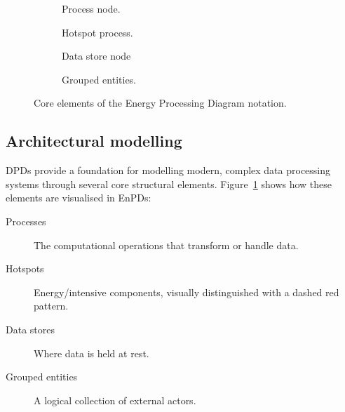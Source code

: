 \begin{figure}[ht]
  \begin{subfigure}[b]{0.23\linewidth}
    \centering
    \caption{Process node.}
  \end{subfigure}
  \hfill
  \begin{subfigure}[b]{0.23\linewidth}
    \centering
    \caption{Hotspot process.}
  \end{subfigure}
  \hfill
  \begin{subfigure}[b]{0.23\linewidth}
    \centering
    \caption{Data store node}
  \end{subfigure}
  \hfill
  \begin{subfigure}[b]{0.23\linewidth}
    \centering
    \caption{Grouped entities.}
  \end{subfigure}
  \caption{Core elements of the Energy Processing Diagram notation.}%
  \label{fig:elements}
\end{figure}

\subsection{Architectural modelling}
DPDs provide a foundation for modelling modern, complex data processing systems through several core structural elements.
Figure~\ref{fig:elements} shows how these elements are visualised in EnPDs:
\begin{description}
  \item[Processes] The computational operations that transform or handle data.
  \item[Hotspots] Energy\-/intensive components, visually distinguished with a dashed red pattern.
  \item[Data stores] Where data is held at rest.
  \item[Grouped entities] A logical collection of external actors.
\end{description}

